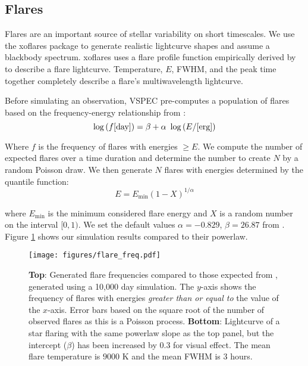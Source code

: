 \documentclass[twocolumn]{aastex631}
\begin{document}
\subsection{Flares \label{subsec:flares}}
Flares are an important source of stellar variability on short timescales. We use the {\sc xoflares}
package \citep{barclay2020} to generate realistic lightcurve shapes and assume a blackbody spectrum.
{\sc xoflares} uses a flare profile function empirically derived by \citet{davenport2016} to
describe a flare lightcurve. Temperature, $E$, FWHM, and the peak time together completely describe a flare's multiwavelength lightcurve.

Before simulating an observation, {\sc VSPEC} pre-computes a population of flares based on the frequency-energy relationship from \citet{gao2022}:
\begin{equation} \label{eq:flare_freq}
    \log{(f{\rm [day]})} = \beta + \alpha~\log{(E/{\rm [erg]})}
\end{equation}

Where $f$ is the frequency of flares with energies $\ge E$.
We compute the number of expected flares over a time duration and determine the number to create $N$ by a random Poisson draw.
We then generate $N$ flares with energies determined by the quantile function:
\begin{equation}
    E = E_{\text{min}} (1-X)^{1/\alpha}
\end{equation}

where $E_{\text{min}}$ is the minimum considered flare energy and $X$ is a random number on the interval $[0,1)$.
We set the default values $\alpha=-0.829$, $\beta=26.87$ from \citet{gao2022}. Figure \ref{fig:flare_freq}
shows our simulation results compared to their powerlaw.

\begin{figure}
    \centering
    \texttt{[image: figures/flare\_freq.pdf]}
    \caption{
        {\bf Top}: Generated flare frequencies compared to those expected from \citet{gao2022}, generated using a 10,000 day simulation.
        The $y$-axis shows the frequency of flares with energies {\em greater than or equal to} the value of the $x$-axis. Error bars
        based on the square root of the number of observed flares as this is a Poisson process.
        {\bf Bottom}: Lightcurve of a star flaring with the same powerlaw slope as the top panel, but the intercept ($\beta$) has been increased by 0.3
        for visual effect. The mean flare temperature is $9000$ K and the mean FWHM is $3$ hours.
        }
    \label{fig:flare_freq}
\end{figure}
\end{document}
